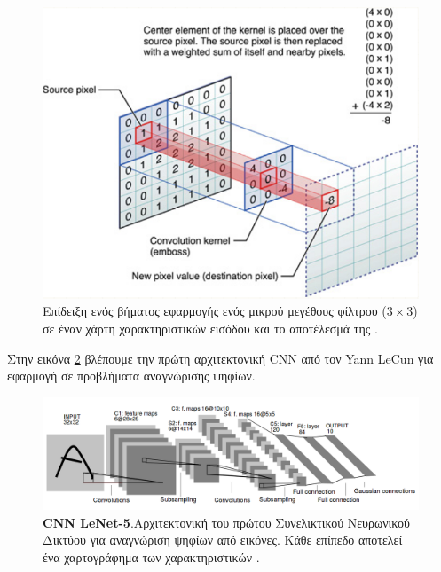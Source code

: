 \begin{figure}[H]
 \centering
 \includegraphics[width=\textwidth, scale=0.5]{Images/cnn_layer}
\caption[\textgreek{Επίπεδο Συνέλιξης}]{\textgreek{Επίδειξη ενός βήματος εφαρμογής ενός μικρού μεγέθους φίλτρου ($3\times 3$) σε έναν χάρτη χαρακτηριστικών εισόδου και το αποτέλεσμά της} \cite{cnnprimer}.}
 \label{fig:conv_layer}
\end{figure}
\textgreek{Στην εικόνα }\ref{fig:lenet} \textgreek{βλέπουμε την πρώτη αρχιτεκτονική} CNN \textgreek{από τον }Yann LeCun \textgreek{για εφαρμογή σε προβλήματα αναγνώρισης ψηφίων. }

\begin{figure}[H]
 \centering
 \includegraphics[width=\textwidth, scale=0.5]{Images/lenet_5}
\caption[\textgreek{ΣΝΔ }Lenet-5]{\textbf{CNN LeNet-5}.\textgreek{Αρχιτεκτονική του πρώτου Συνελικτικού Νευρωνικού Δικτύου για αναγνώριση ψηφίων από εικόνες. Κάθε επίπεδο αποτελεί ένα χαρτογράφημα των χαρακτηριστικών} \cite{lecun_net}.}
 \label{fig:lenet}
\end{figure}

